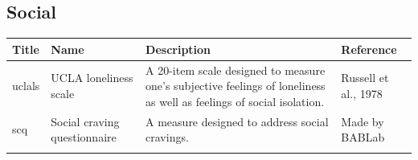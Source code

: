 \documentclass[]{book}
\begin{document}
\hypertarget{social}{%
\subsection{Social}\label{social}}

\begin{longtable}[]{@{}llll@{}}
\toprule
\begin{minipage}[b]{0.22\columnwidth}\raggedright
Title\strut
\end{minipage} & \begin{minipage}[b]{0.27\columnwidth}\raggedright
Name\strut
\end{minipage} & \begin{minipage}[b]{0.22\columnwidth}\raggedright
Description\strut
\end{minipage} & \begin{minipage}[b]{0.18\columnwidth}\raggedright
Reference\strut
\end{minipage}\tabularnewline
\midrule
\endhead
\begin{minipage}[t]{0.22\columnwidth}\raggedright
uclals\strut
\end{minipage} & \begin{minipage}[t]{0.27\columnwidth}\raggedright
UCLA loneliness scale\strut
\end{minipage} & \begin{minipage}[t]{0.22\columnwidth}\raggedright
A 20-item scale designed to measure one's subjective feelings of loneliness as well as feelings of social isolation.\strut
\end{minipage} & \begin{minipage}[t]{0.18\columnwidth}\raggedright
Russell et al., 1978\strut
\end{minipage}\tabularnewline
\begin{minipage}[t]{0.22\columnwidth}\raggedright
scq\strut
\end{minipage} & \begin{minipage}[t]{0.27\columnwidth}\raggedright
Social craving questionnaire\strut
\end{minipage} & \begin{minipage}[t]{0.22\columnwidth}\raggedright
A measure designed to address social cravings.\strut
\end{minipage} & \begin{minipage}[t]{0.18\columnwidth}\raggedright
Made by BABLab\strut
\end{minipage}\tabularnewline
\begin{minipage}[t]{0.22\columnwidth}\raggedright

\end{minipage}
\end{longtable}
\end{document}
